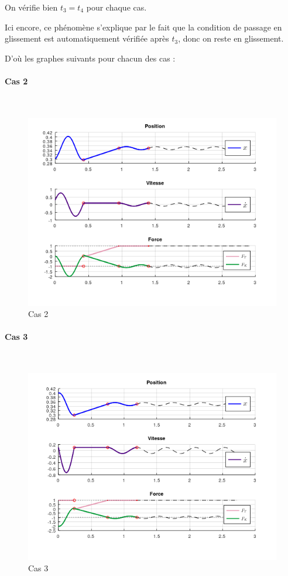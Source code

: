 \documentclass{article}
\begin{document}
On vérifie bien $t_3=t_4$ pour chaque cas. 

Ici encore, ce phénomène s'explique par le fait que la condition de passage en glissement est automatiquement vérifiée après $t_3$, donc on reste en glissement. 

D'où les graphes suivants  pour chacun des cas :

\paragraph{Cas 2}
$ $ 
\begin{figure}[h!]
	\centering
	\includegraphics[scale=.6]{CAS2.png}
	\caption{Cas 2}
\end{figure}

\paragraph{Cas 3}
$ $ 
\begin{figure}[h!]
	\centering
	\includegraphics[scale=.75]{CAS3.png}
	\caption{Cas 3}
\end{figure}
\end{document}
